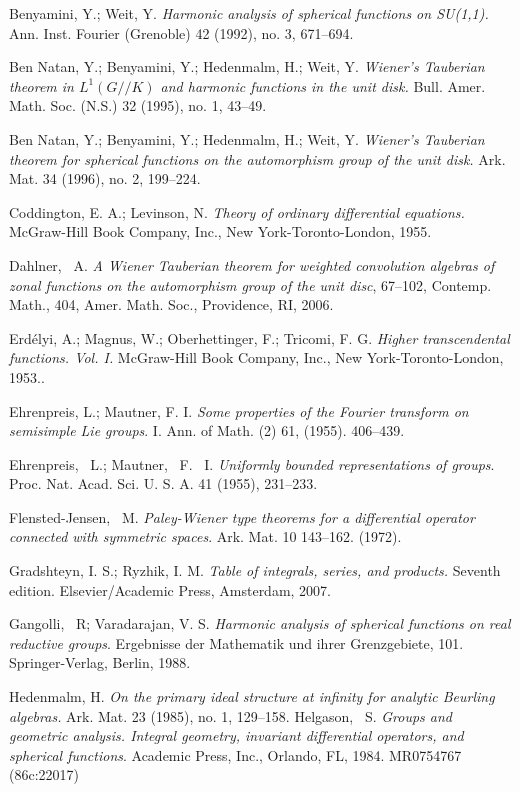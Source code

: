 \documentclass[11pt,reqno]{amsart}
\theoremstyle{definition}
\theoremstyle{definition}
\numberwithin{equation}{section}
\begin{document}
\begin{thebibliography}{99}
 Benyamini, Y.; Weit, Y. {\em Harmonic analysis of spherical functions on SU(1,1).}  Ann. Inst. Fourier (Grenoble) 42 (1992), no. 3, 671--694. 

  Ben Natan, Y.; Benyamini, Y.; Hedenmalm, H.; Weit, Y. {\em Wiener's Tauberian theorem in $L^1(G//K)$ and harmonic functions in the unit disk.}  Bull. Amer. Math. Soc. (N.S.) 32 (1995), no. 1, 43--49.

  Ben Natan, Y.; Benyamini, Y.; Hedenmalm, H.; Weit, Y. {\em Wiener's Tauberian theorem for spherical functions on the automorphism group of the unit disk.} Ark. Mat. 34 (1996), no. 2, 199--224.

  Coddington, E. A.; Levinson, N.  {\em Theory of ordinary differential equations.} McGraw-Hill Book Company, Inc., New York-Toronto-London, 1955.

 Dahlner, ~A. {\em A Wiener Tauberian theorem for weighted convolution algebras of zonal functions on the automorphism group of the unit disc}, 67--102, Contemp. Math., 404, Amer. Math. Soc., Providence, RI, 2006. 
 
  Erd\'{e}lyi, A.; Magnus, W.; Oberhettinger, F.; Tricomi, F. G. {\em Higher transcendental functions. Vol. I.}  McGraw-Hill Book Company, Inc., New York-Toronto-London, 1953..
 
 
Ehrenpreis, L.; Mautner, F. I. {\em Some properties of the Fourier transform on semisimple Lie groups}. I.  Ann. of Math. (2)  61,  (1955). 406--439. 

 Ehrenpreis, ~L.; Mautner, ~F. ~I. {\em Uniformly bounded representations of groups}.
Proc. Nat. Acad. Sci. U. S. A.  41  (1955), 231--233. 

Flensted-Jensen, ~M. {\em Paley-Wiener type theorems for a differential operator connected with symmetric spaces}.  Ark. Mat.  10 143--162. (1972). 

  Gradshteyn, I. S.; Ryzhik, I. M. {\em Table of integrals, series, and products.}  Seventh edition. Elsevier/Academic Press, Amsterdam, 2007. 


 Gangolli, ~R; Varadarajan, V. S. {\em Harmonic analysis of spherical functions on real reductive groups}. Ergebnisse der Mathematik und ihrer Grenzgebiete, 101. Springer-Verlag, Berlin, 1988.   

  Hedenmalm, H. {\em On the primary ideal structure at infinity for analytic Beurling algebras.}  Ark. Mat. 23 (1985), no. 1, 129--158.
 Helgason, ~S. {\em Groups and geometric analysis. Integral geometry, invariant differential operators, and spherical functions}.  Academic Press, Inc., Orlando, FL, 1984. MR0754767 (86c:22017)



\end{thebibliography}
\end{document}
